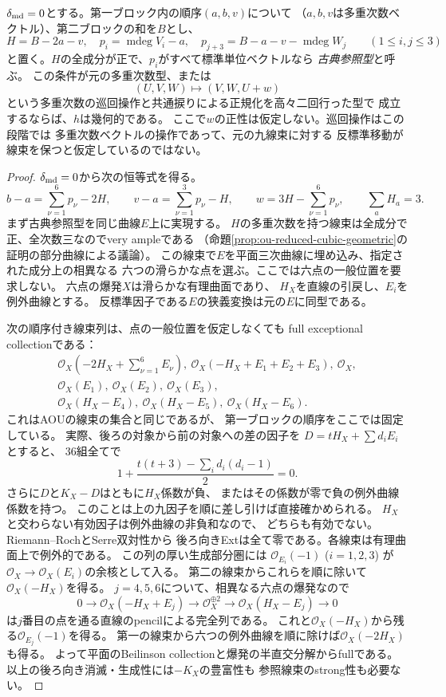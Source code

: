 \begin{lemma}
\label{lem:ou-reduced-classical-reference}
$\delta_{\rm md}=0$とする。第一ブロック内の順序$(a,b,v)$について
（$a,b,v$は多重次数ベクトル）、第二ブロックの和を$B$とし、
\[
 H=B-2a-v,\quad
 p_i=\operatorname{mdeg}V_i-a,\quad
 p_{j+3}=B-a-v-\operatorname{mdeg}W_j
 \qquad(1\leq i,j\leq3)
\]
と置く。$H$の全成分が正で、$p_i$がすべて標準単位ベクトルなら
\emph{古典参照型}と呼ぶ。
この条件が元の多重次数型、または
\[
 (U,V,W)\longmapsto(V,W,U+w)
\]
という多重次数の巡回操作と共通捩りによる正規化を高々二回行った型で
成立するならば、$h$は幾何的である。
ここで$w$の正性は仮定しない。巡回操作はこの段階では
多重次数ベクトルの操作であって、元の九線束に対する
反標準移動が線束を保つと仮定しているのではない。
\end{lemma}
\begin{proof}
$\delta_{\rm md}=0$から次の恒等式を得る。
\[
 b-a=\sum_{\nu=1}^6p_\nu-2H,\qquad
 v-a=\sum_{\nu=1}^3p_\nu-H,\qquad
 w=3H-\sum_{\nu=1}^6p_\nu,\qquad \sum_a H_a=3.
\]
まず古典参照型を同じ曲線$E$上に実現する。
$H$の多重次数を持つ線束は全成分で正、全次数三なのでvery ampleである
（命題\ref{prop:ou-reduced-cubic-geometric}の証明の部分曲線による議論）。
この線束で$E$を平面三次曲線に埋め込み、指定された成分上の相異なる
六つの滑らかな点を選ぶ。ここでは六点の一般位置を要求しない。
六点の爆発$X$は滑らかな有理曲面であり、
$H_X$を直線の引戻し、$E_i$を例外曲線とする。
反標準因子である$E$の狭義変換は元の$E$に同型である。

次の順序付き線束列は、点の一般位置を仮定しなくても
full exceptional collectionである：
\[
\begin{gathered}
 \mathcal O_X(-2H_X+\sum_{\nu=1}^6 E_\nu),\
 \mathcal O_X(-H_X+E_1+E_2+E_3),\
 \mathcal O_X,\\
 \mathcal O_X(E_1),\ \mathcal O_X(E_2),\ \mathcal O_X(E_3),\\
 \mathcal O_X(H_X-E_4),\ \mathcal O_X(H_X-E_5),\
 \mathcal O_X(H_X-E_6).
\end{gathered}
\]
これはAOU\cite[(4.1)]{AOU2024}の線束の集合と同じであるが、
第一ブロックの順序をここでは固定している。
実際、後ろの対象から前の対象への差の因子を
$D=tH_X+\sum d_iE_i$とすると、
36組全てで
\[
 1+\frac{t(t+3)-\sum_i d_i(d_i-1)}2=0.
\]
さらに$D$と$K_X-D$はともに$H_X$係数が負、
またはその係数が零で負の例外曲線係数を持つ。
このことは上の九因子を順に差し引けば直接確かめられる。
$H_X$と交わらない有効因子は例外曲線の非負和なので、
どちらも有効でない。Riemann--RochとSerre双対性から
後ろ向きExtは全て零である。各線束は有理曲面上で例外的である。
この列の厚い生成部分圏には
$\mathcal O_{E_i}(-1)$ ($i=1,2,3$) が
$\mathcal O_X\to\mathcal O_X(E_i)$の余核として入る。
第二の線束からこれらを順に除いて$\mathcal O_X(-H_X)$を得る。
$j=4,5,6$について、相異なる六点の爆発なので
\[
 0\longrightarrow\mathcal O_X(-H_X+E_j)
 \longrightarrow\mathcal O_X^{\oplus2}
 \longrightarrow\mathcal O_X(H_X-E_j)\longrightarrow0
\]
は$j$番目の点を通る直線のpencilによる完全列である。
これと$\mathcal O_X(-H_X)$から残る$\mathcal O_{E_j}(-1)$を得る。
第一の線束から六つの例外曲線を順に除けば$\mathcal O_X(-2H_X)$も得る。
よって平面のBeilinson collectionと爆発の半直交分解からfullである。
以上の後ろ向き消滅・生成性には$-K_X$の豊富性も
参照線束のstrong性も必要ない。


\end{proof}

